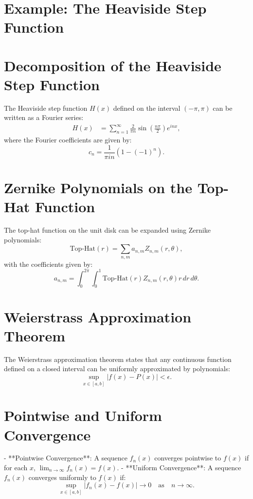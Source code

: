 % 
%
\section{Example: The Heaviside Step Function}
\section{Decomposition of the Heaviside Step Function}

The Heaviside step function $H(x)$ defined on the interval $(-\pi, \pi)$ can be written as a Fourier series:
\begin{equation}
\begin{split}
H(x) &= \sum_{n=1}^{\infty} \frac{2}{\pi n} \sin\left(\frac{n\pi}{2}\right) e^{inx},
\end{split}
\end{equation}
where the Fourier coefficients are given by:
\begin{equation}
c_n = \frac{1}{\pi in} (1 - (-1)^n).
\end{equation}

\section{Zernike Polynomials on the Top-Hat Function}

The top-hat function on the unit disk can be expanded using Zernike polynomials:
\begin{equation}
\text{Top-Hat}(r) = \sum_{n,m} a_{n,m} Z_{n,m}(r, \theta),
\end{equation}
with the coefficients given by:
\begin{equation}
a_{n,m} = \int_0^{2\pi} \int_0^1 \text{Top-Hat}(r) Z_{n,m}(r, \theta) r \, dr \, d\theta.
\end{equation}

\section{Weierstrass Approximation Theorem}

The Weierstrass approximation theorem states that any continuous function defined on a closed interval can be uniformly approximated by polynomials:
\begin{equation}
\sup_{x \in [a, b]} |f(x) - P(x)| < \epsilon.
\end{equation}

\section{Pointwise and Uniform Convergence}

- **Pointwise Convergence**: A sequence \(f_n(x)\) converges pointwise to \(f(x)\) if for each \(x\), \(\lim_{n \to \infty} f_n(x) = f(x)\).
- **Uniform Convergence**: A sequence \(f_n(x)\) converges uniformly to \(f(x)\) if:
\begin{equation}
\sup_{x \in [a, b]} |f_n(x) - f(x)| \to 0 \quad \text{as} \quad n \to \infty.
\end{equation}
\endinput  %
